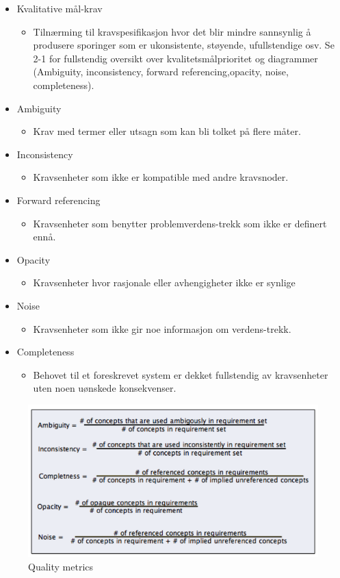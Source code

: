 \begin{itemize}
\item
  Kvalitative mål-krav
  \begin{itemize}
  \item
    Tilnærming til kravspesifikasjon hvor det blir mindre sannsynlig å
    produsere sporinger som er ukonsistente, støyende, ufullstendige
    osv. Se 2-1 for fullstendig oversikt over kvalitetsmålprioritet og
    diagrammer (Ambiguity, inconsistency, forward referencing,opacity,
    noise, completeness).
  \end{itemize}
\item
  Ambiguity
  \begin{itemize}
  \item
    Krav med termer eller utsagn som kan bli tolket på flere måter.
  \end{itemize}
\item
  Inconsistency
  \begin{itemize}
  \item
    Kravsenheter som ikke er kompatible med andre kravsnoder.
  \end{itemize}
\item
  Forward referencing
  \begin{itemize}
  \item
    Kravsenheter som benytter problemverdens-trekk som ikke er definert
    ennå.
  \end{itemize}
\item
  Opacity
  \begin{itemize}
  \item
    Kravsenheter hvor rasjonale eller avhengigheter ikke er synlige
  \end{itemize}
\item
  Noise
  \begin{itemize}
  \item
    Kravsenheter som ikke gir noe informasjon om verdens-trekk.
  \end{itemize}
\item
  Completeness
  \begin{itemize}
  \item
    Behovet til et foreskrevet system er dekket fullstendig av
    kravsenheter uten noen uønskede konsekvenser.
  \end{itemize}
\end{itemize}
\begin{figure}[htbp]
\centering
\includegraphics{Forelesning 02/img/quality-metrics.PNG}
\caption{Quality metrics}
\end{figure}

